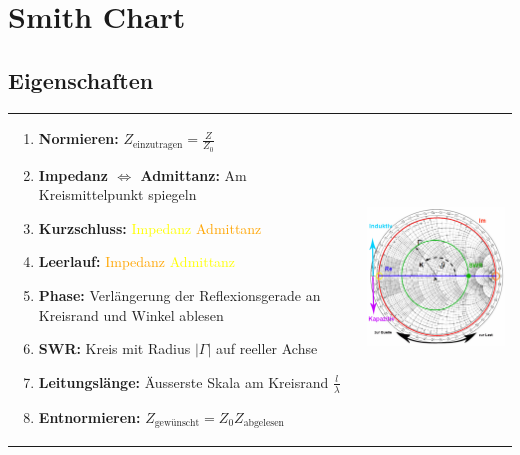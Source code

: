 
\section{Smith Chart}
\subsection{Eigenschaften}
	\begin{tabular}{p{10cm}p{8cm}}
		\begin{minipage}{10cm}
        	\begin{enumerate}{\setlength{\itemsep}{0cm}\setlength{\parsep}{0cm} \setlength{\topsep}{0cm}}
              \item \textbf{Normieren:} $Z_{\text{einzutragen}} = \frac{Z}{Z_0}$
              \item \textbf{Impedanz $\Leftrightarrow$ Admittanz:} Am Kreismittelpunkt spiegeln
              \item \textbf{Kurzschluss:} 	\textcolor{yellow}{Impedanz} \textcolor{orange}{Admittanz}
              \item \textbf{Leerlauf:}		\textcolor{orange}{Impedanz} \textcolor{yellow}{Admittanz}
        	  \item \textbf{Phase:}	Verlängerung der Reflexionsgerade an Kreisrand und Winkel ablesen
        	  \item \textbf{SWR:} Kreis mit Radius $|\Gamma|$ auf reeller Achse
        	  \item \textbf{Leitungslänge:} Äusserste Skala am Kreisrand  $\frac{l}{\lambda}$
        	  \item \textbf{Entnormieren:} $Z_{\text{gewünscht}} = Z_0
        	  Z_{\text{abgelesen}}$
            \end{enumerate}
        \end{minipage} &
		\begin{minipage}{8cm}
        	\includegraphics[height=7cm]{./bilder/SmithChart2.png}
        \end{minipage}
	\end{tabular}
